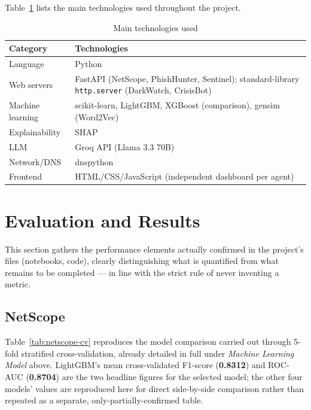 \documentclass[12pt,a4paper]{report}
\begin{document}
Table~\ref{tab:tech} lists the main technologies used throughout the project.

\begin{table}[htbp]
\centering
\begin{tabular}{@{}>{\raggedright\arraybackslash}p{4cm}>{\raggedright\arraybackslash}p{8.5cm}@{}}
\toprule
\textbf{Category} & \textbf{Technologies} \\
\midrule
Language & Python \\
Web servers & FastAPI (NetScope, PhishHunter, Sentinel); standard-library \texttt{http.server} (DarkWatch, CrisisBot) \\
Machine learning & scikit-learn, LightGBM, XGBoost (comparison), gensim (Word2Vec) \\
Explainability & SHAP \\
LLM & Groq API (Llama 3.3 70B) \\
Network/DNS & dnspython \\
Frontend & HTML/CSS/JavaScript (independent dashboard per agent) \\
\bottomrule
\end{tabular}
\caption{Main technologies used}
\label{tab:tech}
\end{table}

\section{Evaluation and Results}

This section gathers the performance elements actually confirmed in the project's files (notebooks, code), clearly distinguishing what is quantified from what remains to be completed --- in line with the strict rule of never inventing a metric.

\subsection*{NetScope}
Table~\ref{tab:netscope-cv} reproduces the model comparison carried out through 5-fold stratified cross-validation, already detailed in full under \emph{Machine Learning Model} above. LightGBM's mean cross-validated F1-score (\textbf{0.8312}) and ROC-AUC (\textbf{0.8704}) are the two headline figures for the selected model; the other four models' values are reproduced here for direct side-by-side comparison rather than repeated as a separate, only-partially-confirmed table.
\end{document}
